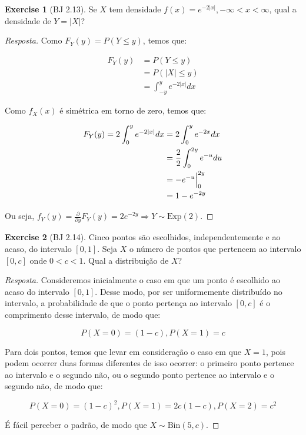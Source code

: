 \documentclass[
]{article}
\theoremstyle{definition}
\theoremstyle{definition}
\theoremstyle{definition}
\newtheorem{exercise}{Exercise}[section]
\theoremstyle{definition}
\theoremstyle{remark}
\begin{document}
\begin{exercise}[BJ 2.13]
Se \(X\) tem densidade \(f(x) = e^{-2|x|}, -\infty < x < \infty\), qual a densidade de \(Y = |X|\)?
\end{exercise}

\begin{proof}[Resposta]
Como \(F_{Y}(y) = P(Y \le y)\), temos que:

\begin{align*}
F_{Y}(y) &= P(Y \le y) \\
&= P(|X| \le y) \\
&= \int_{-y}^{y}e^{-2|x|}dx
\end{align*}

Como \(f_{X}(x)\) é simétrica em torno de zero, temos que:

\begin{align*}
F_{Y}(y) = 2\int_{0}^{y}e^{-2|x|}dx &= 2\int_{0}^{y}e^{-2x}dx \\
&= \frac{2}{2}\int_{0}^{2y}e^{-u}du \\
&= -e^{-u}\Big{|}_{0}^{2y} \\
&= 1 - e^{-2y}
\end{align*}

Ou seja, \(f_{Y}(y) = \frac{\partial}{\partial y}F_{Y}(y) = 2e^{-2y} \Rightarrow Y \sim \mathrm{Exp}(2)\).
\end{proof}

\begin{exercise}[BJ 2.14]
Cinco pontos são escolhidos, independentemente e ao acaso, do intervalo \([0,1]\). Seja \(X\) o número de pontos que pertencem ao intervalo \([0,c]\) onde \(0 < c < 1\). Qual a distribuição de \(X\)?
\end{exercise}

\begin{proof}[Resposta]
Consideremos inicialmente o caso em que um ponto é escolhido ao acaso do intervalo \([0,1]\). Desse modo, por ser uniformemente distribuído no intervalo, a probabilidade de que o ponto pertença ao intervalo \([0,c]\) é o comprimento desse intervalo, de modo que:

\begin{equation*}
P(X = 0) = (1-c),P(X = 1) = c
\end{equation*}

Para dois pontos, temos que levar em consideração o caso em que \(X = 1\), pois podem ocorrer duas formas diferentes de isso ocorrer: o primeiro ponto pertence ao intervalo e o segundo não, ou o segundo ponto pertence ao intervalo e o segundo não, de modo que:

\begin{equation*}
P(X = 0) = (1-c)^{2},P(X = 1) = 2c(1-c), P(X = 2) = c^{2}
\end{equation*}

É fácil perceber o padrão, de modo que \(X \sim \mathrm{Bin}(5,c)\).
\end{proof}
\end{document}
